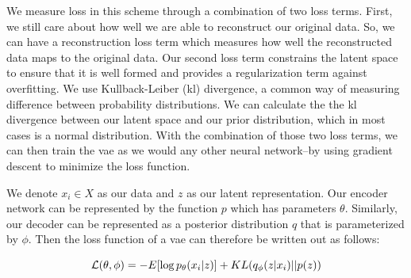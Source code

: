 We measure loss in this scheme through a combination of two loss terms.
First, we still care about how well we are able to reconstruct our original data.
So, we can have a reconstruction loss term which measures how well the reconstructed data maps to the original data.
Our second loss term constrains the latent space to ensure that it is well formed and provides a regularization term against overfitting.
We use Kullback-Leiber (\gls{kl}) divergence, a common way of measuring difference between probability distributions.
We can calculate the the \gls{kl} divergence between our latent space and our prior distribution, which in most cases is a normal distribution.
With the combination of those two loss terms, we can then train the \gls{vae} as we would any other neural network--by using gradient descent to minimize the loss function.

We denote $x_i \in X$ as our data and $z$ as our latent representation.
Our encoder network can be represented by the function $p$ which has parameters $\theta$.
Similarly, our decoder can be represented as a posterior distribution $q$ that is parameterized by $\phi$.
Then the loss function of a \gls{vae} can therefore be written out as follows:

\begin{equation}\label{eqn:vae-loss}
\mathcal{L}(\theta, \phi) = - E[\log p_{\theta}(x_i | z)] + KL(q_{\phi}(z | x_i) || p(z)) \\
\end{equation}

